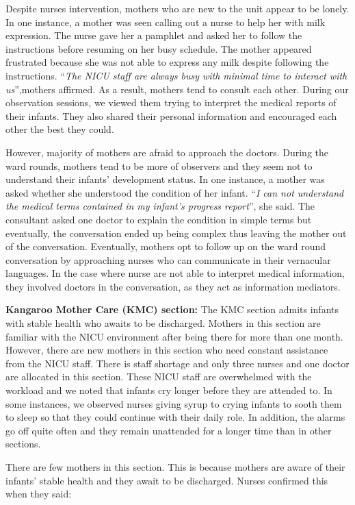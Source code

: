 Despite nurses intervention, mothers who are new to the unit appear to be lonely. In one instance, a mother was seen calling out a nurse to help her with milk expression. The nurse gave her a pamphlet and asked her to follow the instructions before resuming on her busy schedule. The mother appeared frustrated because she was not able to express any milk despite following the instructions. \enquote{\itshape The NICU staff are always busy with minimal time to interact with us},mothers affirmed. As a result, mothers tend to consult each other. During our observation sessions, we viewed them trying to interpret the medical reports of their infants. They also shared their personal information and encouraged each other the best they could.

However, majority of mothers are afraid to approach the doctors. During the ward rounds, mothers tend to be more of observers and they seem not to understand their infants' development status. In one instance, a mother was asked whether she understood the condition of her infant. \enquote{\itshape I can not understand the medical terms contained in my infant’s progress report}, she said. The consultant asked one doctor to explain the condition in simple terms but eventually, the conversation ended up being complex thus leaving the mother out of the conversation. Eventually, mothers opt to follow up on the ward round conversation by approaching nurses who can communicate in their vernacular languages. In the case where nurse are not able to interpret medical information, they involved doctors in the conversation, as they act as information mediators. 

\textbf{Kangaroo Mother Care (KMC) section:}
The KMC section admits infants with stable health who awaits to be discharged. Mothers in this section are familiar with the NICU environment after being there for more than one month. However, there are new mothers in this section who need constant assistance from the NICU staff. There is staff shortage and only three nurses and one doctor are allocated in this section. These NICU staff are overwhelmed with the workload and we noted that infants cry longer before they are attended to. In some instances, we observed nurses giving syrup to crying infants to sooth them to sleep so that they could continue with their daily role. In addition, the alarms go off quite often and they remain unattended for a longer time than in other sections. 

There are few mothers in this section. This is because mothers are aware of their infants' stable health and they await to be discharged. Nurses confirmed this when they said:

